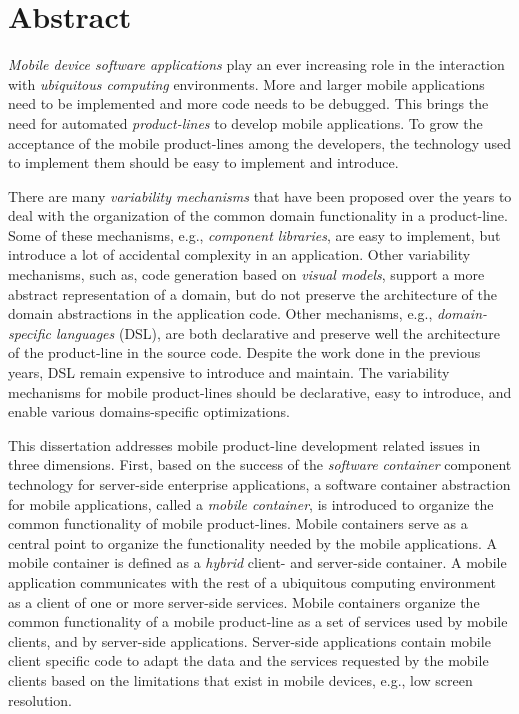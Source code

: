 \chapter*{Abstract}


\noindent \textit{Mobile device software applications} play an ever increasing role in the interaction with \textit{ubiquitous computing} environments. More and larger mobile applications need to be implemented and more code needs to be debugged. This brings the need for automated \textit{product-lines} to develop mobile applications. To grow the acceptance of the mobile product-lines among the developers, the technology used to implement them should be easy to implement and introduce. 

There are many \textit{variability mechanisms} that have been proposed over the years to deal with the organization of the common domain functionality in a product-line. Some of these mechanisms, e.g., \textit{component libraries}, are easy to implement, but introduce a lot of accidental complexity in an application. Other variability mechanisms, such as, code generation based on \textit{visual models}, support a more abstract representation of a domain, but do not preserve the architecture of the domain abstractions in the application code. Other mechanisms, e.g., \textit{domain-specific languages} (DSL), are both declarative and preserve well the architecture of the product-line in the source code. Despite the work done in the previous years, DSL remain expensive to introduce and maintain. The variability mechanisms for mobile product-lines should be declarative, easy to introduce, and enable various domains-specific optimizations.

This dissertation addresses mobile product-line development related issues in three dimensions. First, based on the success of the \textit{software container} component technology for server-side enterprise applications, a software container abstraction for mobile applications, called a \textit{mobile container}, is introduced to organize the common functionality of mobile product-lines. Mobile containers serve as a central point to organize the functionality needed by the mobile applications. A mobile container is defined as a \textit{hybrid} client- and server-side container. A mobile application communicates with the rest of a ubiquitous computing environment as a client of one or more server-side services. Mobile containers organize the common functionality of a mobile product-line as a set of services used by mobile clients, and by server-side applications. Server-side applications contain mobile client specific code to adapt the data and the services requested by the mobile clients based on the limitations that exist in mobile devices, e.g., low screen resolution. 

